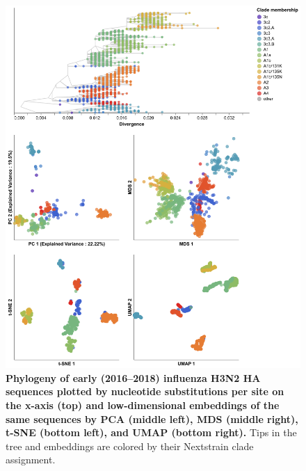 \documentclass[10pt,letterpaper]{article}
\begin{document}
\begin{figure}[!h]
\includegraphics[width=\columnwidth]{figures/flu-2016-2018-ha-embeddings-by-clade.png}
\caption{{\bf Phylogeny of early (2016--2018) influenza H3N2 HA sequences plotted by nucleotide substitutions per site on the x-axis (top) and low-dimensional embeddings of the same sequences by PCA (middle left), MDS (middle right), t-SNE (bottom left), and UMAP (bottom right).}
  Tips in the tree and embeddings are colored by their Nextstrain clade assignment.
}
\label{fig:seasonal-influenza-h3n2-ha-embeddings}
\end{figure}
\end{document}
